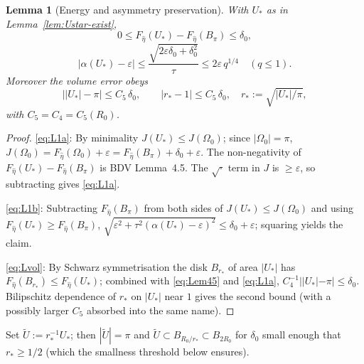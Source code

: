 \documentclass[11pt]{amsart}
\newtheorem{lemma}[theorem]{Lemma}
\newcommand{\wt}{\widetilde}
\begin{document}
\begin{lemma}[Energy and asymmetry preservation]\label{lem:Ustar-quot}
With \(U_*\) as in Lemma~\ref{lem:Ustar-exist},
\begin{equation}\label{eq:L1a}
   0\le F_{\hat\eta}(U_*)-F_{\hat\eta}(B_\pi)\le\delta_0,
\end{equation}
\begin{equation}\label{eq:L1b}
   |\alpha(U_*)-\varepsilon|\le\frac{\sqrt{2\varepsilon\delta_0+\delta_0^2}}
      {\tau}\le 2\varepsilon\,q^{1/4}\quad(q\le 1).
\end{equation}
Moreover the volume error obeys
\begin{equation}\label{eq:Lvol}
   \bigl||U_*|-\pi\bigr|\le C_5\,\delta_0,
   \qquad
   |r_*-1|\le C_5\,\delta_0,
   \quad r_*:=\sqrt{|U_*|/\pi},
\end{equation}
with \(C_5=C_4=C_5(R_0)\).
\end{lemma}

\begin{proof}
\eqref{eq:L1a}: By minimality \(J(U_*)\le J(\Omega_0)\); since
\(|\Omega_0|=\pi\),
\(J(\Omega_0)=F_{\hat\eta}(\Omega_0)+\varepsilon
=F_{\hat\eta}(B_\pi)+\delta_0+\varepsilon\).  The non-negativity of
\(F_{\hat\eta}(U_*)-F_{\hat\eta}(B_\pi)\) is BDV Lemma~4.5.  The
\(\sqrt{\cdot}\) term in \(J\) is \(\ge\varepsilon\), so subtracting
gives \eqref{eq:L1a}.

\eqref{eq:L1b}: Subtracting \(F_{\hat\eta}(B_\pi)\) from both sides of
\(J(U_*)\le J(\Omega_0)\) and using \(F_{\hat\eta}(U_*)\ge
F_{\hat\eta}(B_\pi)\),
\(\sqrt{\varepsilon^{2}+\tau^{2}(\alpha(U_*)-\varepsilon)^{2}}\le
\delta_0+\varepsilon\); squaring yields the claim.

\eqref{eq:Lvol}: By Schwarz symmetrisation the disk \(B_{r_*}\) of area
\(|U_*|\) has \(F_{\hat\eta}(B_{r_*})\le F_{\hat\eta}(U_*)\); combined
with \eqref{eq:Lem45} and \eqref{eq:L1a},
\(C_4^{-1}||U_*|-\pi|\le\delta_0\).  Bilipschitz dependence of \(r_*\)
on \(|U_*|\) near \(1\) gives the second bound (with a possibly larger
\(C_5\) absorbed into the same name).
\end{proof}

Set \(\wt U:=r_*^{-1}U_*\); then \(|\wt U|=\pi\) and \(\wt U\subset
B_{R_0/r_*}\subset B_{2R_0}\) for \(\delta_0\) small enough that
\(r_*\ge 1/2\) (which the smallness threshold below ensures).
\end{document}
